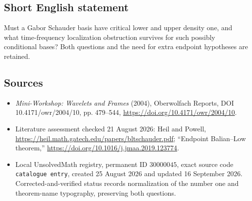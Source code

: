 \documentclass[11pt]{article}
\begin{document}
\subsection{Short English statement}
Must a Gabor Schauder basis have critical lower and upper density one, and what time-frequency localization obstruction survives for such possibly conditional bases? Both questions and the need for extra endpoint hypotheses are retained.
\subsection{Sources}
\begin{itemize}
\item \emph{Mini-Workshop: Wavelets and Frames} (2004), Oberwolfach Reports, DOI 10.4171/owr/2004/10, pp. 479--544, \url{https://doi.org/10.4171/owr/2004/10}.
\item Literature assessment checked 21 August 2026: Heil and Powell, \url{https://heil.math.gatech.edu/papers/bltschauder.pdf}; ``Endpoint Balian--Low theorem,'' \url{https://doi.org/10.1016/j.jmaa.2019.123774}.
\item Local UnsolvedMath registry, permanent ID $30000045$, exact source code \texttt{catalogue entry}, created 25 August 2026 and updated 16 September 2026. Corrected-and-verified status records normalization of the number one and theorem-name typography, preserving both questions.
\end{itemize}
\end{document}

